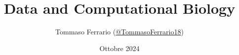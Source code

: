 \documentclass[a4paper, oneside]{book}
\title{Data and Computational Biology}
\author{Tommaso Ferrario (\href{https://github.com/TommasoFerrario18}{@TommasoFerrario18})}
\date{Ottobre 2024}
\begin{document}
\maketitle
\newtheorem{teorema}{Teorema}
\newtheorem{dimostrazione}{Dimostrazione}
\newtheorem{definizione}{Definizione}
\newtheorem{esempio}{Esempio}
\newtheorem{osservazione}{Osservazione}
\newtheorem{nota}{Nota}
\newtheorem{corollario}{Corollario}
\tableofcontents
\renewcommand{\chaptermark}[1]{
    \markboth{\chaptername
        \ \thechapter.\ #1}{}}
\renewcommand{\sectionmark}[1]{\markright{\thesection.\ #1}}



\end{document}
